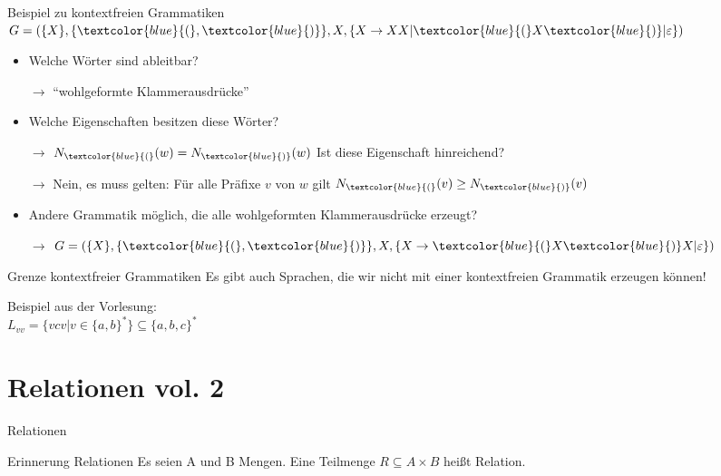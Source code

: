 \documentclass[]{beamer}
\begin{document}
\begin{frame}{Beispiel zu kontextfreien Grammatiken}
	$G= (\{X\}, \{\textcolor{blue}{(}, \textcolor{blue}{)}\}, X, \{X \rightarrow XX|\textcolor{blue}{(} X \textcolor{blue}{)}| \varepsilon\} )$
	\begin{itemize}
		\item Welche Wörter sind ableitbar?
		\pause
		\item[$\rightarrow$] ``wohlgeformte Klammerausdrücke''
		\pause
		\item Welche Eigenschaften besitzen diese Wörter?
		\pause
		\item[$\rightarrow$]$N_{\textcolor{blue}{(}}(w) = N_{\textcolor{blue}{)}}(w)$ \pause Ist diese Eigenschaft hinreichend?
		\pause
		\item[$\rightarrow$]Nein, es muss gelten: Für alle Präfixe $v$ von $w$ gilt $ N_{\textcolor{blue}{(}}(v) \geq N_{\textcolor{blue}{)}}(v)$
		\pause
		\item Andere Grammatik möglich, die alle wohlgeformten Klammerausdrücke erzeugt?
		\pause
		\item[$\rightarrow$]  $G= (\{X\}, \{\textcolor{blue}{(}, \textcolor{blue}{)}\}, X, \{X \rightarrow \textcolor{blue}{(} X \textcolor{blue}{)}X| \varepsilon\} )$
	\end{itemize}
\end{frame}

\begin{frame}{Grenze kontextfreier Grammatiken}
	Es gibt auch Sprachen, die wir nicht mit einer kontextfreien Grammatik erzeugen können!
	
	\vspace{.3cm} \bp
	Beispiel aus der Vorlesung:\\
	$L_{vv} = \{vcv| v \in \{a,b\}^*\} \subseteq \{a, b, c\}^*$
\end{frame}


\section{Relationen vol. 2}
\begin{frame}{Relationen}
	\pause
	\begin{block}{Erinnerung Relationen}
		Es seien A und B Mengen. Eine Teilmenge $R \subseteq A \times B$ heißt Relation.
	\end{block}
\end{frame}
\end{document}
